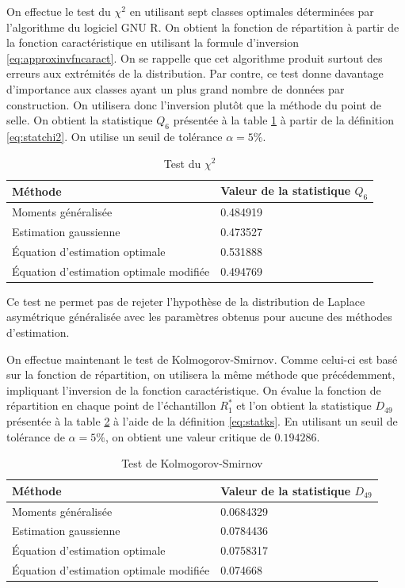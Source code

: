 On effectue le test du $\chi^2$ en utilisant sept classes optimales
déterminées par l'algorithme du logiciel GNU R. On obtient la fonction
de répartition à partir de la fonction caractéristique en utilisant la
formule d'inversion \eqref{eq:approxinvfncaract}. On se rappelle que
cet algorithme produit surtout des erreurs aux extrémités de la
distribution. Par contre, ce test donne davantage d'importance aux
classes ayant un plus grand nombre de données par construction. On
utilisera donc l'inversion plutôt que la méthode du point de selle. On
obtient la statistique $Q_{6}$ présentée à la table
\ref{tab:testchi2R1} à partir de la définition \eqref{eq:statchi2}. On
utilise un seuil de tolérance $\alpha = 5\%$.
\begin{table}[!ht]
  \centering
  \begin{tabular}{ll}
    \hline
    \textbf{Méthode} & \textbf{Valeur de la statistique $Q_{6}$} \\
    \hline
    Moments généralisée              &  0.484919 \\
    Estimation gaussienne        &  0.473527 \\
    Équation d'estimation optimale    &  0.531888 \\
    Équation d'estimation optimale modifiée  &  0.494769 \\
    \hline
  \end{tabular}
  \caption{Test du $\chi^2$}
  \label{tab:testchi2R1}
\end{table}

Ce test ne permet pas de rejeter l'hypothèse de la distribution de
Laplace asymétrique généralisée avec les paramètres obtenus pour
aucune des méthodes d'estimation.

On effectue maintenant le test de Kolmogorov-Smirnov. Comme celui-ci
est basé sur la fonction de répartition, on utilisera la même méthode
que précédemment, impliquant l'inversion de la fonction
caractéristique. On évalue la fonction de répartition en chaque point
de l'échantillon $R_1^{*}$ et l'on obtient la statistique $D_{49}$
présentée à la table \ref{tab:testKSR1} à l'aide de la définition
\eqref{eq:statks}. En utilisant un seuil de tolérance de $\alpha=5\%$,
on obtient une valeur critique de $0.194286$.

\begin{table}[!ht]
  \centering
  \begin{tabular}{ll}
    \hline
    \textbf{Méthode} & \textbf{Valeur de la statistique $D_{49}$} \\
    \hline
    Moments généralisée & 0.0684329  \\
    Estimation gaussienne & 0.0784436   \\
    Équation d'estimation optimale & 0.0758317  \\
    Équation d'estimation optimale modifiée & 0.074668  \\
    \hline
  \end{tabular}
  \caption{Test de Kolmogorov-Smirnov}
  \label{tab:testKSR1}
\end{table}

